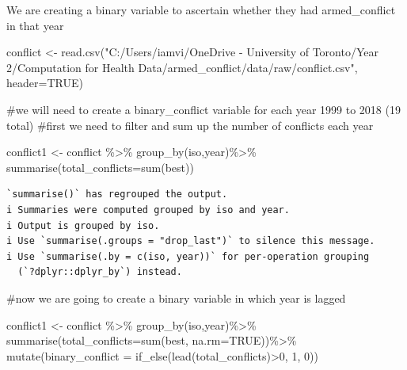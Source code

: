 \documentclass[
  letterpaper,
  DIV=11,
  numbers=noendperiod]{scrartcl}
\newenvironment{Shaded}{\begin{snugshade}}{\end{snugshade}}
\newcommand{\AttributeTok}[1]{\textcolor[rgb]{0.40,0.45,0.13}{#1}}
\newcommand{\CommentTok}[1]{\textcolor[rgb]{0.37,0.37,0.37}{#1}}
\newcommand{\ConstantTok}[1]{\textcolor[rgb]{0.56,0.35,0.01}{#1}}
\newcommand{\DecValTok}[1]{\textcolor[rgb]{0.68,0.00,0.00}{#1}}
\newcommand{\FunctionTok}[1]{\textcolor[rgb]{0.28,0.35,0.67}{#1}}
\newcommand{\NormalTok}[1]{\textcolor[rgb]{0.00,0.23,0.31}{#1}}
\newcommand{\OtherTok}[1]{\textcolor[rgb]{0.00,0.23,0.31}{#1}}
\newcommand{\SpecialCharTok}[1]{\textcolor[rgb]{0.37,0.37,0.37}{#1}}
\newcommand{\StringTok}[1]{\textcolor[rgb]{0.13,0.47,0.30}{#1}}
\begin{document}
We are creating a binary variable to ascertain whether they had
armed\_conflict in that year

\begin{Shaded}
\begin{Highlighting}[]
\NormalTok{conflict }\OtherTok{\textless{}{-}} \FunctionTok{read.csv}\NormalTok{(}\StringTok{"C:/Users/iamvi/OneDrive {-} University of Toronto/Year 2/Computation for Health Data/armed\_conflict/data/raw/conflict.csv"}\NormalTok{, }\AttributeTok{header=}\ConstantTok{TRUE}\NormalTok{)}

\CommentTok{\#we will need to create a binary\_conflict variable for each year 1999 to 2018 (19 total)}
\CommentTok{\#first we need to filter and sum up the number of conflicts each year}

\NormalTok{conflict1 }\OtherTok{\textless{}{-}}\NormalTok{ conflict }\SpecialCharTok{\%\textgreater{}\%} \FunctionTok{group\_by}\NormalTok{(iso,year)}\SpecialCharTok{\%\textgreater{}\%} \FunctionTok{summarise}\NormalTok{(}\AttributeTok{total\_conflicts=}\FunctionTok{sum}\NormalTok{(best))}
\end{Highlighting}
\end{Shaded}

\begin{verbatim}
`summarise()` has regrouped the output.
i Summaries were computed grouped by iso and year.
i Output is grouped by iso.
i Use `summarise(.groups = "drop_last")` to silence this message.
i Use `summarise(.by = c(iso, year))` for per-operation grouping
  (`?dplyr::dplyr_by`) instead.
\end{verbatim}

\begin{Shaded}
\begin{Highlighting}[]
\CommentTok{\#now we are going to create a binary variable in which year is lagged }


\NormalTok{conflict1 }\OtherTok{\textless{}{-}}\NormalTok{ conflict }\SpecialCharTok{\%\textgreater{}\%} \FunctionTok{group\_by}\NormalTok{(iso,year)}\SpecialCharTok{\%\textgreater{}\%} \FunctionTok{summarise}\NormalTok{(}\AttributeTok{total\_conflicts=}\FunctionTok{sum}\NormalTok{(best, }\AttributeTok{na.rm=}\ConstantTok{TRUE}\NormalTok{))}\SpecialCharTok{\%\textgreater{}\%} \FunctionTok{mutate}\NormalTok{(}\AttributeTok{binary\_conflict =} \FunctionTok{if\_else}\NormalTok{(}\FunctionTok{lead}\NormalTok{(total\_conflicts)}\SpecialCharTok{\textgreater{}}\DecValTok{0}\NormalTok{, }\DecValTok{1}\NormalTok{, }\DecValTok{0}\NormalTok{))}
\end{Highlighting}
\end{Shaded}
\end{document}
